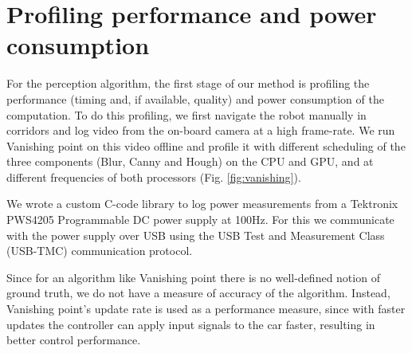 \section{Profiling performance and power consumption}
\label{sec:profiling}
For the perception algorithm, the first stage of our method is profiling the performance (timing and, if available, quality) and power consumption of the computation. 
To do this profiling, we first navigate the robot manually in corridors and log video from the on-board camera at a high frame-rate. 
We run Vanishing point on this video offline and profile it with different scheduling of the three components (Blur, Canny and Hough) on the CPU and GPU, and at different frequencies of both processors (Fig. \ref{fig:vanishing}).

We wrote a custom C-code library to log power measurements from a Tektronix PWS4205 Programmable DC power supply at 100Hz. 
For this we communicate with the power supply over USB using the USB Test and Measurement Class (USB-TMC) communication protocol. 

Since for an algorithm like Vanishing point there is no well-defined notion of ground truth, we do not have a measure of accuracy of the algorithm. 
Instead, Vanishing point's update rate is used as a performance measure, since with faster updates the controller can apply input signals to the car faster, resulting in better control performance. 



